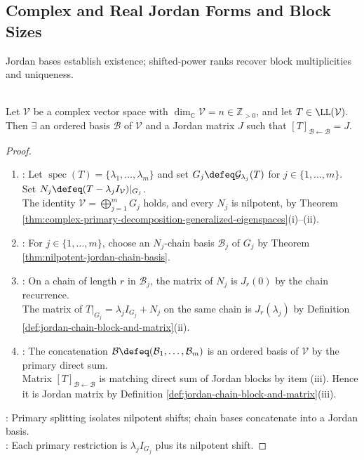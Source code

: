\subsection{Complex and Real Jordan Forms and Block Sizes}

Jordan bases establish existence; shifted-power ranks recover block multiplicities and uniqueness.

\begin{theorem} \label{thm:complex-jordan-form} \\
Let $\mathcal{V}$ be a complex vector space with $\dim_{\mathbb{C}}\mathcal{V}=n\in\mathbb{Z}_{>0}$, and let $T\in\LL(\mathcal{V})$.\\
Then $\exists$ an ordered basis $\mathcal{B}$ of $\mathcal{V}$ and a Jordan matrix $J$ such that $[T]_{\mathcal{B}\leftarrow\mathcal{B}}=J$.
\begin{proof}
\begin{enumerate}[label=(\roman*)]
\setlength{\itemsep}{0pt}
\item {}: Let $\operatorname{spec}(T)=\{\lambda_1,\ldots,\lambda_m\}$ and set $G_j\defeq\mathcal{G}_{\lambda_j}(T)$ for $j\in\{1,\ldots,m\}$. Set $N_j\defeq(T-\lambda_jI_{\mathcal{V}})|_{G_j}$.\\
The identity $\mathcal{V}=\bigoplus\limits_{j=1}^{m}G_j$ holds, and every $N_j$ is nilpotent, by Theorem \ref{thm:complex-primary-decomposition-generalized-eigenspaces}(i)--(ii).
\item {}: For $j\in\{1,\ldots,m\}$, choose an $N_j$-chain basis $\mathcal{B}_j$ of $G_j$ by Theorem \ref{thm:nilpotent-jordan-chain-basis}.
\item {}: On a chain of length $r$ in $\mathcal{B}_j$, the matrix of $N_j$ is $J_r(0)$ by the chain recurrence.\\
The matrix of $T|_{G_j}=\lambda_jI_{G_j}+N_j$ on the same chain is $J_r(\lambda_j)$ by Definition \ref{def:jordan-chain-block-and-matrix}(ii).
\item {}: The concatenation $\mathcal{B}\defeq(\mathcal{B}_1,\ldots,\mathcal{B}_m)$ is an ordered basis of $\mathcal{V}$ by the primary direct sum.\\
Matrix $[T]_{\mathcal{B}\leftarrow\mathcal{B}}$ is matching direct sum of Jordan blocks by item (iii). Hence it is Jordan matrix by Definition \ref{def:jordan-chain-block-and-matrix}(iii).
\end{enumerate}
: Primary splitting isolates nilpotent shifts; chain bases concatenate into a Jordan basis.\\
: Each primary restriction is $\lambda_jI_{G_j}$ plus its nilpotent shift.
\end{proof}
\end{theorem}

